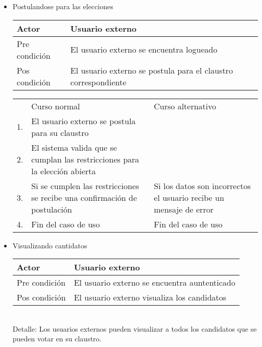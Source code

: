 \begin{itemize}
\bigskip
\item Postulandose para las elecciones
\bigskip
\begin{center}
\begin{tabular}{ll}
Actor & Usuario externo \\
\hline
Pre condición & El usuario externo se encuentra logueado \\
\hline
Pos condición & El usuario externo se postula para el claustro correspondiente\\
\hline
\end{tabular}
\medskip
\begin{tabular}{c p{4cm}|p{4cm}}
 & Curso normal & Curso alternativo \\
 1. & El usuario externo se postula para su claustro &  \\
 2. & El sistema valida que se cumplan las restricciones para la elección abierta & \\
 3. & Si se cumplen las restricciones se recibe una confirmación de postulación & Si los datos son incorrectos el usuario recibe un mensaje de error\\
 4. & Fin del caso de uso & Fin del caso de uso \\
\end{tabular}
\end{center}

\bigskip
\item Visualizando cantidatos
\bigskip
\begin{center}
\begin{tabular}{ll}
Actor & Usuario externo\\
\hline
Pre condición & El usuario externo se encuentra auntenticado\\
\hline
Pos condición & El usuario externo visualiza los candidatos\\
\hline
\end{tabular}
\\
\medskip
Detalle: Los usuarios externos pueden visualizar a todos los candidatos que se pueden votar en su claustro.
\end{center}


\end{itemize}
